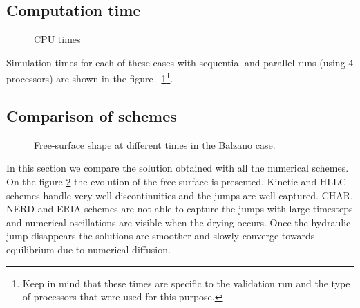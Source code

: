 \subsection{Computation time}

\begin{figure}[H]
  \centering
  \caption{CPU times}\label{fig:balzano:cputime}
\end{figure}

Simulation times for each of these cases with sequential and parallel runs (using 4 processors) are shown in the figure ~\ref{fig:balzano:cputime}\footnote{Keep in mind that these times
are specific to the validation run and the type of processors that were used for this purpose.}.

\subsection{Comparison of schemes}

\begin{figure}[H]
\begin{minipage}[t]{0.5\textwidth}
 \centering
\end{minipage}%
\begin{minipage}[t]{0.5\textwidth}
 \centering
\end{minipage}
\begin{minipage}[t]{0.5\textwidth}
 \centering
\end{minipage}%
\begin{minipage}[t]{0.5\textwidth}
 \centering
\end{minipage}
\begin{minipage}[t]{0.5\textwidth}
 \centering
\end{minipage}%
\begin{minipage}[t]{0.5\textwidth}
 \centering
\end{minipage}
\caption{Free-surface shape at different times in the Balzano case.}
\label{fig:balzano:SL}
\end{figure}

In this section we compare the solution obtained with all the numerical schemes.
On the figure \ref{fig:balzano:SL} the evolution of the free surface is presented.
Kinetic and HLLC schemes handle very well discontinuities and the jumps are well captured.
CHAR, NERD and ERIA schemes are not able to capture the jumps with large timesteps and numerical oscillations are visible when the drying occurs. Once the hydraulic jump disappears the solutions are smoother and slowly converge towards equilibrium due to numerical diffusion.

